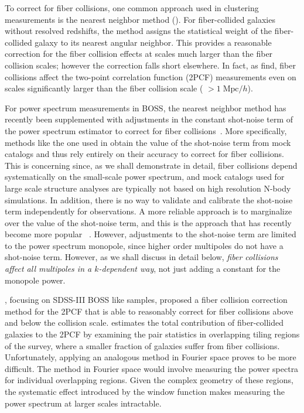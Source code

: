 To correct for fiber collisions, one common approach used in clustering 
measurements is the nearest neighbor method (\citealt{Zehavi:2002aa, Zehavi:2005aa, 
Zehavi:2011aa, Berlind:2006aa, Anderson:2012aa}). For fiber-collided galaxies without 
resolved redshifts, the method assigns the statistical weight of the 
fiber-collided galaxy to its nearest angular neighbor. This provides 
a reasonable correction for the fiber collision effects at scales much 
larger than the fiber collision scales; however the correction falls short 
elsewhere. In fact, as \cite{Zehavi:2005aa} find, 
fiber collisions affect the two-point correlation function (2PCF) 
measurements even on scales significantly larger than the fiber collision 
scale ( $> 1\;\mathrm{Mpc}/h$). 

For power spectrum measurements in BOSS, 
the nearest neighbor method has recently been supplemented with adjustments 
in the constant shot-noise term of the power spectrum estimator to correct 
for fiber collisions~\citep{Beutler:2014aa, Gil-Marin:2014aa, 
Gil-Marin:2016ab, Gil-Marin:2016aa, Beutler:2016aa, Grieb:2016aa}. More specifically, 
methods like the one used in 
\cite{Gil-Marin:2014aa} obtain the value of the shot-noise term from mock catalogs and thus rely entirely on their accuracy to correct for fiber collisions. 
This is concerning since, as we shall demonstrate in detail, fiber 
collisions depend systematically on the small-scale power spectrum, and mock catalogs used for large scale structure analyses are typically 
not based on high resolution N-body simulations. In addition, there is no way to validate and 
calibrate the shot-noise term independently for observations. A more 
reliable approach is to marginalize over the value of the shot-noise 
term, and this is the approach that has recently become more popular
~\citep{Gil-Marin:2016ab, Beutler:2016aa, Grieb:2016aa, Gil-Marin:2016aa}. 
However, adjustments to the shot-noise term are limited to the power spectrum monopole, since higher order multipoles do not have a shot-noise term. However, as we shall discuss in detail below, {\em fiber collisions affect all multipoles in a $k$-dependent way}, not just adding a constant for the monopole power.

\cite{Guo:2012aa}, focusing on SDSS-III BOSS like samples, proposed 
a fiber collision correction method for the 2PCF that is able to reasonably 
correct for fiber collisions above and below the collision scale. 
\cite{Guo:2012aa} estimates the total contribution of fiber-collided galaxies 
to the 2PCF by examining the pair statistics in overlapping tiling regions of 
the survey, where a smaller fraction of galaxies suffer from fiber collisions.
Unfortunately, applying an analogous method in Fourier space proves to be more difficult. 
The \cite{Guo:2012aa} method in Fourier space would involve measuring the power spectra 
for individual overlapping regions. Given the complex geometry of these 
regions, the systematic effect introduced by the window function makes 
measuring the power spectrum at larger scales intractable. 

